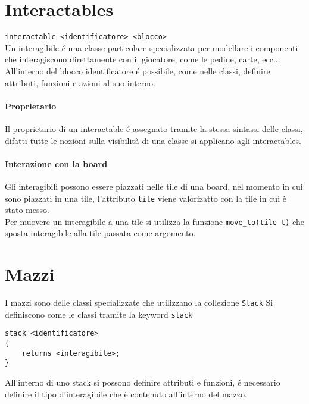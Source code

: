 \section{Interactables}
\lstinline|interactable <identificatore> <blocco>| \\
Un interagibile é una classe particolare specializzata per modellare i componenti che interagiscono
direttamente con il giocatore, come le pedine, carte, ecc... \\
All'interno del blocco identificatore é possibile, come nelle classi, definire attributi,
funzioni e azioni al suo interno. 

\paragraph{Proprietario}
Il proprietario di un interactable é assegnato tramite la stessa sintassi delle classi,
difatti tutte le nozioni sulla visibilità di una classe si applicano agli interactables.

\paragraph{Interazione con la board}
Gli interagibili possono essere piazzati nelle tile di una board, nel momento in cui sono piazzati
in una tile, l'attributo \lstinline|tile| viene valorizatto con la tile in cui è stato messo. \\
Per muovere un interagibile a una tile si utilizza la funzione \lstinline|move_to(tile t)| che
sposta interagibile alla tile passata come argomento. \\ 

\section{Mazzi}
I mazzi sono delle classi specializzate che utilizzano la collezione \lstinline|Stack| 
Si definiscono come le classi tramite la keyword \lstinline|stack|
\begin{lstlisting}
stack <identificatore> 
{ 
    returns <interagibile>;
}
\end{lstlisting}
All'interno di uno stack si possono definire attributi e funzioni, 
é necessario definire il tipo d'interagibile che è contenuto all'interno del mazzo.  

